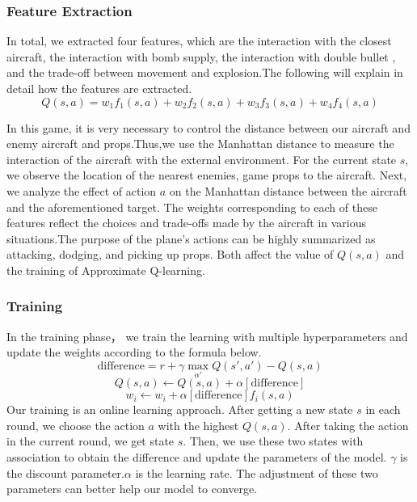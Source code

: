 \documentclass{article}
\begin{document}
    \subsubsection{Feature Extraction}
        In total, we extracted four features, which are the interaction with the closest aircraft, the interaction with bomb supply, the interaction with double bullet , and the trade-off between movement and explosion.The following will explain in detail how the features are extracted.
        \[Q(s,a) = w_1f_1(s,a)+w_2f_2(s,a)+w_3f_3(s,a)+w_4f_4(s,a)\]
    
        In this game, it is very necessary to control the distance between our aircraft and enemy aircraft and props.Thus,we use the Manhattan distance to measure the interaction of the aircraft with the external environment. For the current state $s$, we observe the location of the nearest enemies, game props to the aircraft. Next, we analyze the effect of action $a$ on the Manhattan distance between the aircraft and the aforementioned target. The weights corresponding to each of these features reflect the choices and trade-offs made by the aircraft in various situations.The purpose of the plane's actions can be highly summarized as attacking, dodging, and picking up props. Both affect the value of $Q(s,a)$ and the training of Approximate Q-learning.
    \subsubsection{Training}
        In the training phase， we train the learning with multiple hyperparameters and update the weights according to the formula below.
        \[ \mathrm{difference} = r+\gamma \mathop{\mathrm{max}}_{\alpha'}Q(s',a')-Q(s,a)\]
        \[ Q(s,a) \xleftarrow{} Q(s,a) +\alpha[\mathrm{difference}]\]
        \[w_i \xleftarrow{} w_i+\alpha[\mathrm{difference}] f_i(s,a)\]
        Our training is an online learning approach. After getting a new state $s$ in each round, we choose the action $a$ with the highest $Q(s,a)$. After taking the action in the current round, we get state $s$. Then, we use these two states with association to obtain the difference and update the parameters of the model. $\gamma$ is the discount parameter.$\alpha$ is the learning rate. The adjustment of these two parameters can better help our model to converge.
        
    
    
\end{document}
